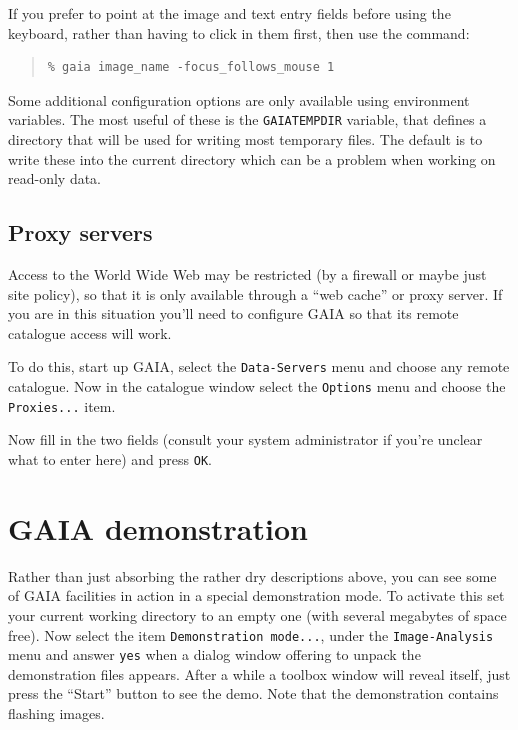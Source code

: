 \documentclass[twoside,11pt]{article}
\newcommand{\xlabel}[1]{}
\renewcommand{\_}{\texttt{\symbol{95}}}
\newcommand{\mytt}[1]{{\texttt{#1}}}
\begin{document}
If you prefer to point at the image and text entry fields before using
the keyboard, rather than having to click in them first, then use the
command:
\begin{quote}
\begin{verbatim}
% gaia image_name -focus_follows_mouse 1
\end{verbatim}
\end{quote}

Some additional configuration options are only available using environment
variables. The most useful of these is the \mytt{GAIA\_TEMP\_DIR} variable,
that defines a directory that will be used for writing most temporary files.
The default is to write these into the current directory which can be a
problem when working on read-only data.

\subsection{\xlabel{proxy_servers}Proxy servers}
Access to the World Wide Web may be restricted (by a firewall or maybe
just site policy), so that it is only available through a ``web
cache'' or proxy server. If you are in this situation you'll need to
configure GAIA so that its remote catalogue access will work.

To do this, start up GAIA, select the \mytt{Data-Servers} menu and
choose any remote catalogue. Now in the catalogue window select the
\mytt{Options} menu and choose the \mytt{Proxies...} item.

Now fill in the two fields (consult your system administrator if you're
unclear what to enter here) and press \mytt{OK}.

\section{\xlabel{gaia_demonstration}GAIA demonstration}
Rather than just absorbing the rather dry descriptions above, you can
see some of GAIA facilities in action in a special demonstration
mode. To activate this set your current working directory to an empty
one (with several megabytes of space free). Now select the item
\mytt{Demonstration mode...}, under the \mytt{Image-Analysis} menu and
answer \mytt{yes} when a dialog window offering to unpack the
demonstration files appears. After a while a toolbox window will
reveal itself, just press the ``Start'' button to see the demo. Note
that the demonstration contains flashing images.
\end{document}
